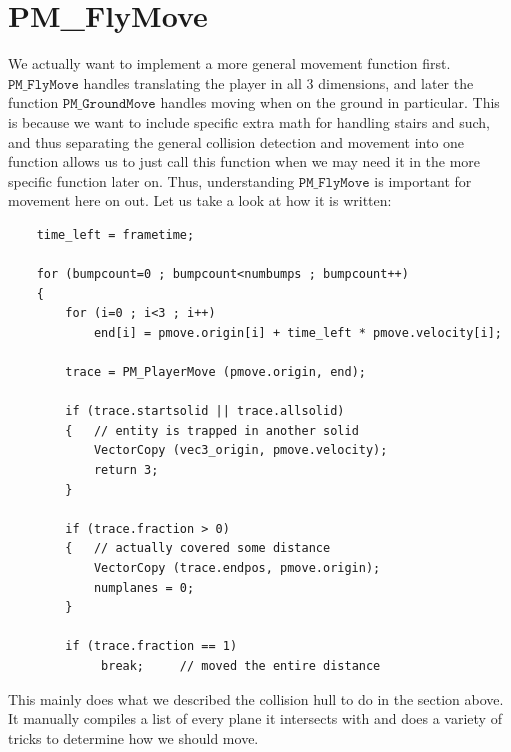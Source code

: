 \documentclass{article}
\begin{document}
\section{PM\_FlyMove}
We actually want to implement a more general movement function first. $\texttt{PM\_FlyMove}$ handles translating the player in all 3 dimensions, and later the function $\texttt{PM\_GroundMove}$ handles moving when on the ground in particular. This is because we want to include specific extra math for handling stairs and such, and thus separating the general collision detection and movement into one function allows us to just call this function when we may need it in the more specific function later on. Thus, understanding $\texttt{PM\_FlyMove}$ is important for movement here on out. Let us take a look at how it is written:
\begin{verbatim}
	time_left = frametime;

	for (bumpcount=0 ; bumpcount<numbumps ; bumpcount++)
	{
		for (i=0 ; i<3 ; i++)
			end[i] = pmove.origin[i] + time_left * pmove.velocity[i];

		trace = PM_PlayerMove (pmove.origin, end);

		if (trace.startsolid || trace.allsolid)
		{	// entity is trapped in another solid
			VectorCopy (vec3_origin, pmove.velocity);
			return 3;
		}

		if (trace.fraction > 0)
		{	// actually covered some distance
			VectorCopy (trace.endpos, pmove.origin);
			numplanes = 0;
		}

		if (trace.fraction == 1)
			 break;		// moved the entire distance
\end{verbatim}

This mainly does what we described the collision hull to do in the section above. It manually compiles a list of every plane it intersects with and does a variety of tricks to determine how we should move. 
\end{document}
